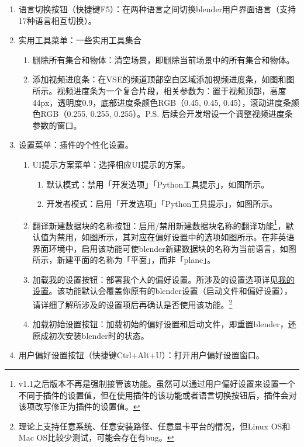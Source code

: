 \documentclass{../../public_resources/doc}
\begin{document}
\begin{enumerate}
    \item 语言切换按钮（快捷键F5）：在两种语言之间切换blender用户界面语言（支持17种语言相互切换）。
    \item 实用工具菜单：一些实用工具集合
    \begin{enumerate}
        \item 删除所有集合和物体：清空场景，即删除当前场景中的所有集合和物体。
        \item 添加视频进度条：在VSE的频道顶部空白区域添加视频进度条，如图和图所示。视频进度条为一个复合片段，相关参数为：置于视频顶部，高度44px，透明度0.9，底部进度条颜色RGB（0.45, 0.45, 0.45），滚动进度条颜色RGB（0.255, 0.255, 0.255）。P.S. 后续会开发增设一个调整视频进度条参数的窗口。
    \end{enumerate}
    \item 设置菜单：插件的个性化设置。
    \begin{enumerate}
        \item UI提示方案菜单：选择相应UI提示的方案。
        \begin{enumerate}
            \item 默认模式：禁用「开发选项」「Python工具提示」，如图所示。
            \item 开发者模式：启用「开发选项」「Python工具提示」，如图所示。
        \end{enumerate}
        \item 翻译新建数据块的名称按钮：启用/禁用新建数据块名称的翻译功能\footnote{v1.1之后版本不再是强制接管该功能。虽然可以通过用户偏好设置来设置一个不同于插件的设置值，但在使用插件的该功能或者语言切换按钮后，插件会对该项改写修正为插件的设置值。}，默认值为禁用，如图所示，其对应在偏好设置中的选项如图所示。在非英语界面环境中，启用该功能可使blender新建数据块的名称为当前语言，如图所示，新建平面的名称为「平面」，而非「plane」。
        \item 加载我的设置按钮：部署我个人的偏好设置。所涉及的设置选项详见\hyperlink{MySettings}{我的设置}。该功能默认会覆盖你原有的blender设置（启动文件和偏好设置），请详细了解所涉及的设置项后再确认是否使用该功能。\footnote{理论上支持任意系统、任意安装路径、任意显卡平台的情况，但Linux OS和Mac OS比较少测试，可能会存在有bug。}
        \item 加载初始设置按钮：加载初始的偏好设置和启动文件，即重置blender，还原成初次安装blender时的状态。
    \end{enumerate}
    \item 用户偏好设置按钮（快捷键Ctrl+Alt+U）：打开用户偏好设置窗口。
\end{enumerate}
\end{document}
